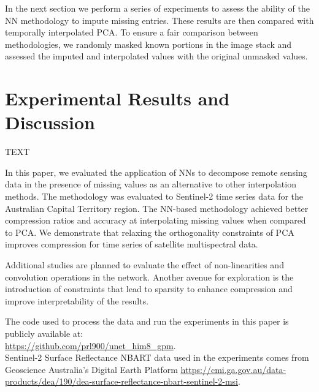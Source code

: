 \documentclass[essd, manuscript]{copernicus}
\begin{document}
In the next section we perform a series of experiments to assess the ability of the NN methodology to impute missing entries. These results are then compared with temporally interpolated PCA. To ensure a fair comparison between methodologies, we randomly masked known portions in the image stack and assessed the imputed and interpolated values with the original unmasked values.


\section{Experimental Results and Discussion}

TEXT


\conclusions  %
In this paper, we evaluated the application of NNs to decompose remote sensing data in the presence of missing values as an alternative to other interpolation methods. The methodology was evaluated to Sentinel-2 time series data for the Australian Capital Territory region. The NN-based methodology achieved better compression ratios and accuracy at interpolating missing values when compared to PCA. We demonstrate that relaxing the orthogonality constraints of PCA improves compression for time series of satellite multispectral data.

Additional studies are planned to evaluate the effect of non-linearities and convolution operations in the network. Another avenue for exploration is the introduction of constraints that lead to sparsity to enhance compression and improve interpretability of the results. 






\codedataavailability{} 
The code used to process the data and run the experiments in this paper is publicly available at: \\
\href{https://github.com/prl900/unet_him8_gpm}{https://github.com/prl900/unet\_him8\_gpm}. \\
Sentinel-2 Surface Reflectance NBART data used in the experiments comes from Geoscience Australia's Digital Earth Platform \href{https://cmi.ga.gov.au/data-products/dea/190/dea-surface-reflectance-nbart-sentinel-2-msi}{https://cmi.ga.gov.au/data-products/dea/190/dea-surface-reflectance-nbart-sentinel-2-msi}. 
\end{document}
